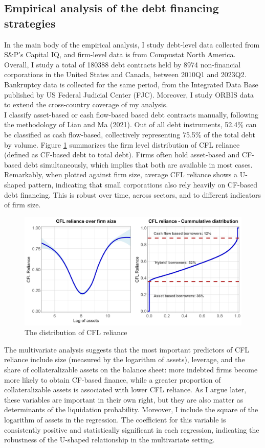 \documentclass[12pt]{article}
\begin{document}
\subsection*{Empirical analysis of the debt financing strategies}
In the main body of the empirical analysis, I study debt-level data collected from S\&P's Capital IQ, and firm-level data is from Compustat North America. Overall, I study a total of 180388 debt contracts held by 8974 non-financial corporations in the United States and Canada, between 2010Q1 and 2023Q2. Bankruptcy data is collected for the same period, from the Integrated Data Base published by US Federal Judicial Center (FJC). Moreover, I study ORBIS data to extend the cross-country coverage of my analysis. \vspace{3mm} \\
I classify asset-based or cash flow-based based debt contracts manually, following the methodology of Lian and Ma (2021). Out of all debt instruments, 52.4\% can be classified as cash flow-based, collectively representing 75.5\% of the total debt by volume. Figure \ref{chart:CFLcdf} summarizes the firm level distribution of CFL reliance (defined as CF-based debt to total debt). Firms often hold asset-based and CF-based debt simultaneously, which implies that both are available in most cases. Remarkably, when plotted against firm size, average CFL reliance shows a U-shaped pattern, indicating that small corporations also rely heavily on CF-based debt financing. This is robust over time, across sectors, and to different indicators of firm size.

\begin{figure}[H]  %
    \centering
    \caption{The distribution of CFL reliance} \label{chart:CFLcdf}
    \includegraphics[width=1\textwidth]{smoothcfd.png}
\end{figure}
The multivariate analysis suggests that the most important predictors of CFL reliance include size (measured by the logarithm of assets), leverage, and the share of collateralizable assets on the balance sheet: more indebted firms become more likely to obtain CF-based finance, while a greater proportion of collateralizable assets is associated with lower CFL reliance. As I argue later, these variables are important in their own right, but they are also matter as determinants of the liquidation probability. Moreover, I include the square of the logarithm of assets in the regression. The coefficient for this variable is consistently positive and statistically significant in each regression, indicating the robustness of the U-shaped relationship in the multivariate setting. 
\end{document}

